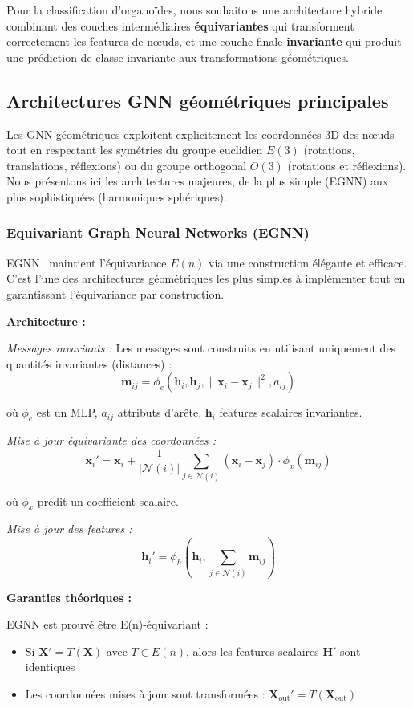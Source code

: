Pour la classification d'organoïdes, nous souhaitons une architecture hybride combinant des couches intermédiaires \textbf{équivariantes} qui transforment correctement les features de nœuds, et une couche finale \textbf{invariante} qui produit une prédiction de classe invariante aux transformations géométriques.

\subsection{Architectures GNN géométriques principales}

Les GNN géométriques exploitent explicitement les coordonnées 3D des nœuds tout en respectant les symétries du groupe euclidien $E(3)$ (rotations, translations, réflexions) ou du groupe orthogonal $O(3)$ (rotations et réflexions). Nous présentons ici les architectures majeures, de la plus simple (EGNN) aux plus sophistiquées (harmoniques sphériques).

\subsubsection{Equivariant Graph Neural Networks (EGNN)}

EGNN~\cite{Satorras2021} maintient l'équivariance $E(n)$ via une construction élégante et efficace. C'est l'une des architectures géométriques les plus simples à implémenter tout en garantissant l'équivariance par construction.

\textbf{Architecture :}

\textit{Messages invariants :}
Les messages sont construits en utilisant uniquement des quantités invariantes (distances) :
\[
\mathbf{m}_{ij} = \phi_e\left(\mathbf{h}_i, \mathbf{h}_j, \|\mathbf{x}_i - \mathbf{x}_j\|^2, a_{ij}\right)
\]

où $\phi_e$ est un MLP, $a_{ij}$ attributs d'arête, $\mathbf{h}_i$ features scalaires invariantes.

\textit{Mise à jour équivariante des coordonnées :}
\[
\mathbf{x}_i' = \mathbf{x}_i + \frac{1}{|\mathcal{N}(i)|}\sum_{j \in \mathcal{N}(i)} (\mathbf{x}_i - \mathbf{x}_j) \cdot \phi_x(\mathbf{m}_{ij})
\]

où $\phi_x$ prédit un coefficient scalaire.

\textit{Mise à jour des features :}
\[
\mathbf{h}_i' = \phi_h\left(\mathbf{h}_i, \sum_{j \in \mathcal{N}(i)} \mathbf{m}_{ij}\right)
\]

\textbf{Garanties théoriques :}

EGNN est prouvé être E(n)-équivariant :
\begin{itemize}
    \item Si $\mathbf{X}' = T(\mathbf{X})$ avec $T \in E(n)$, alors les features scalaires $\mathbf{H}'$ sont identiques
    \item Les coordonnées mises à jour sont transformées : $\mathbf{X}_{\text{out}}' = T(\mathbf{X}_{\text{out}})$
\end{itemize}

